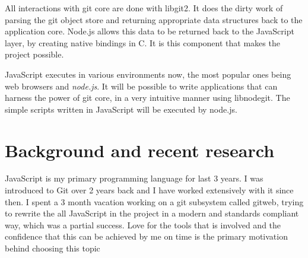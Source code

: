All interactions with git core are done with libgit2. It does the dirty work of
parsing the git object store and returning appropriate data structures back to
the application core. Node.js allows this data to be returned back to the
JavaScript layer, by creating native bindings in C. It is this component that
makes the project possible.

JavaScript executes in various environments now, the most popular ones being web
browsers and \textit{node.js}. It will be possible to write applications that
can harness the power of git core, in a very intuitive manner using libnodegit.
The simple scripts written in JavaScript will be executed by node.js.

\section{Background and recent research}

JavaScript is my primary programming language for last 3 years. I was introduced
to Git over 2 years back and I have worked extensively with it since then. I
spent a 3 month vacation working on a git subsystem called gitweb, trying to
rewrite the all JavaScript in the project in a modern and standards compliant
way, which was a partial success. Love for the tools that is involved and the
confidence that this can be achieved by me on time is the primary motivation
behind choosing this topic
